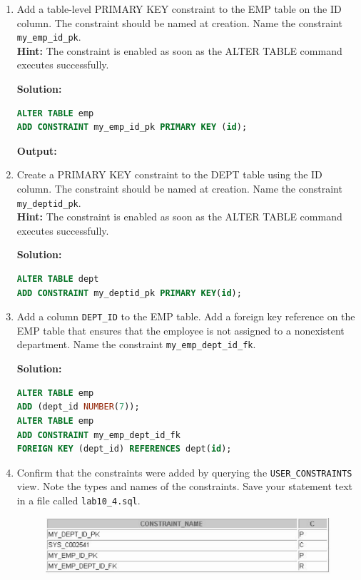 \begin{enumerate}

\item Add a table-level PRIMARY KEY constraint to the EMP table on the ID column. The constraint
should be named at creation. Name the constraint \texttt{my\_emp\_id\_pk}.\\
\textbf{Hint: }The constraint is enabled as soon as the ALTER TABLE command executes
successfully.

\textbf{Solution: }
\begin{lstlisting}[language=SQL]
ALTER TABLE emp
ADD CONSTRAINT my_emp_id_pk PRIMARY KEY (id);
\end{lstlisting}
\textbf{Output: }

\item Create a PRIMARY KEY constraint to the DEPT table using the ID column. The constraint should
be named at creation. Name the constraint \texttt{my\_deptid\_pk}.\\
\textbf{Hint: }The constraint is enabled as soon as the ALTER TABLE command executes
successfully.

\textbf{Solution: }
\begin{lstlisting}[language=SQL]
ALTER TABLE dept
ADD CONSTRAINT my_deptid_pk PRIMARY KEY(id);
\end{lstlisting}

\item Add a column \texttt{DEPT\_ID} to the EMP table. Add a foreign key reference on the EMP table that
ensures that the employee is not assigned to a nonexistent department. Name the constraint
\texttt{my\_emp\_dept\_id\_fk}.

\textbf{Solution: }
\begin{lstlisting}[language=SQL]
ALTER TABLE emp
ADD (dept_id NUMBER(7));
ALTER TABLE emp
ADD CONSTRAINT my_emp_dept_id_fk
FOREIGN KEY (dept_id) REFERENCES dept(id);
\end{lstlisting}

\item Confirm that the constraints were added by querying the \texttt{USER\_CONSTRAINTS} view. Note the
types and names of the constraints. Save your statement text in a file called \texttt{lab10\_4.sql}.
\begin{figure}[h]
\centering
    \includegraphics[width=.8\linewidth]{graphics/104.png}
\end{figure}


\end{enumerate}

